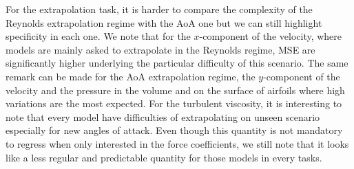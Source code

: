 For the extrapolation task, it is harder to compare the complexity of the Reynolds extrapolation regime with the AoA one but we can still highlight specificity in each one. We note that for the $x$-component of the velocity, where models are mainly asked to extrapolate in the Reynolds regime, \acrshort{MSE} are significantly higher underlying the particular difficulty of this scenario. The same remark can be made for the AoA extrapolation regime, the $y$-component of the velocity and the pressure in the volume and on the surface of airfoils where high variations are the most expected. For the turbulent viscosity, it is interesting to note that every model have difficulties of extrapolating on unseen scenario especially for new angles of attack. Even though this quantity is not mandatory to regress when only interested in the force coefficients, we still note that it looks like a less regular and predictable quantity for those models in every tasks. 

